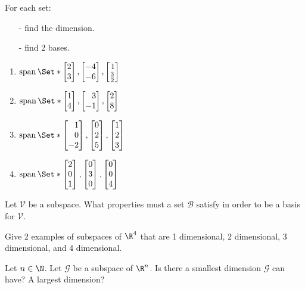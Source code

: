 \begin{exercises}
\begin{problist}
		\prob For each set:
		\begin{itemize}
			\item[-] find the dimension.
			\item[-] find 2 bases.
		\end{itemize}
		\begin{enumerate}
			\item $\Span\Set*{\mat{2\\3}, \mat{-4\\-6}, \mat{1\\\frac{3}{2}}}$
			\item $\Span\Set*{\mat{1\\4}, \mat{3\\-1}, \mat{2\\8}}$
			\item $\Span\Set*{\mat{1\\0\\-2}, \mat{0\\2\\5}, \mat{1\\2\\3}}$
			\item $\Span\Set*{\mat{2\\0\\1}, \mat{0\\3\\0}, \mat{0\\0\\4}}$
		\end{enumerate}

		\prob Let $\mathcal V$ be a subspace. What properties must a set $\mathcal B$ satisfy
		in order to be a basis for $\mathcal V$.

		\prob Give 2 examples of subspaces of $\R^4$ that are 1 dimensional, 2 dimensional,
		3 dimensional, and 4 dimensional.

		\prob Let $n \in \N$. Let $\mathcal G$ be a subspace of $\R^n$. Is there a
		smallest dimension $\mathcal G$ can have? A largest dimension?
	\end{problist}
\end{exercises}
